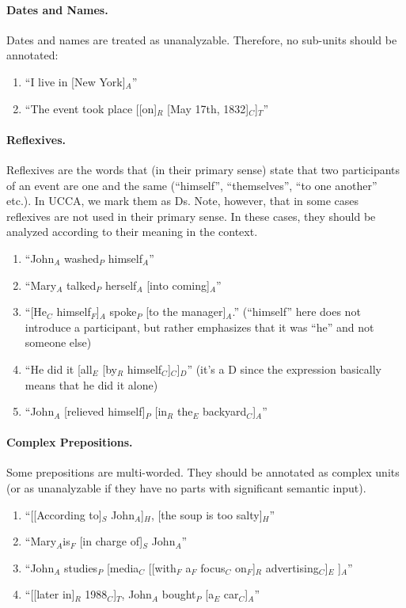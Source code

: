 \documentclass[11pt]{article}
\newcommand{\be}{\begin{enumerate}}
\newcommand{\ee}{\end{enumerate}}
\begin{document}
\paragraph{Dates and Names.} Dates and names are treated as unanalyzable. Therefore, no sub-units should be annotated:
\be \item
``I live in [New York]$_A$''
\item
``The event took place [[on]$_R$ [May 17th, 1832]$_C$]$_T$''
\ee

\paragraph{Reflexives.} Reflexives are the words that (in their primary sense) state that two participants of an event are one and the same (``himself'', ``themselves'', ``to one another'' etc.). In UCCA, we mark them as Ds. Note, however, that in some cases reflexives are not used in their primary sense. In these cases, they should be analyzed according to their meaning in the context.
\be \item
``John$_A$ washed$_P$ himself$_A$''
\item
``Mary$_A$ talked$_P$ herself$_A$ [into coming]$_A$''
\item
``[He$_C$ himself$_F$]$_A$ spoke$_P$ [to the manager]$_A$.'' (``himself'' here does not introduce a participant, but rather emphasizes that it was ``he'' and not someone else)
\item
``He did it [all$_E$ [by$_R$ himself$_C$]$_C$]$_D$'' (it's a D since the expression basically means that he did it alone)
\item
``John$_A$ [relieved himself]$_P$ [in$_R$ the$_E$ backyard$_C$]$_A$''
\ee

\paragraph{Complex Prepositions.} Some prepositions are multi-worded. They should be annotated as complex units (or as unanalyzable if they have no parts with significant semantic input).
\be \item
``[[According  to]$_S$ John$_A$]$_H$, [the soup is too salty]$_H$''
\item
``Mary$_A$is$_F$ [in charge of]$_S$ John$_A$''
\item
``John$_A$ studies$_P$ [media$_C$ [[with$_F$ a$_F$ focus$_C$ on$_F$]$_R$ advertising$_C$]$_E$ ]$_A$''
\item
``[[later in]$_R$ 1988$_C$]$_T$, John$_A$ bought$_P$ [a$_E$ car$_C$]$_A$''
\ee
\end{document}
